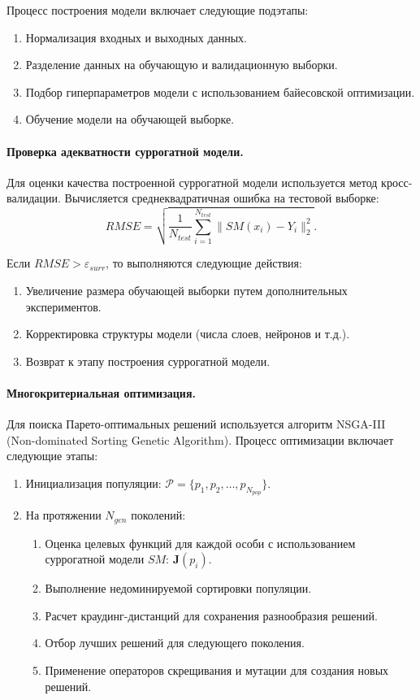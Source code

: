 Процесс построения модели включает следующие подэтапы:
\begin{enumerate}
    \item Нормализация входных и выходных данных.
    \item Разделение данных на обучающую и валидационную выборки.
    \item Подбор гиперпараметров модели с использованием байесовской оптимизации.
    \item Обучение модели на обучающей выборке.
\end{enumerate}

\paragraph*{Проверка адекватности суррогатной модели.}

Для оценки качества построенной суррогатной модели используется метод
кросс-валидации. Вычисляется среднеквадратичная ошибка на тестовой выборке:
\begin{equation}
    RMSE = \sqrt{\frac{1}{N_{test}} \sum_{i=1}^{N_{test}} \| SM(x_i) - Y_i \|_2^2}.
\end{equation}

Если $RMSE > \varepsilon_{surr}$, то выполняются следующие действия:
\begin{enumerate}
    \item Увеличение размера обучающей выборки путем дополнительных экспериментов.
    \item Корректировка структуры модели (числа слоев, нейронов и т.д.).
    \item Возврат к этапу построения суррогатной модели.
\end{enumerate}

\paragraph*{Многокритериальная оптимизация.}

Для поиска Парето-оптимальных решений используется алгоритм NSGA-III (Non-dominated Sorting Genetic Algorithm).
Процесс оптимизации включает следующие этапы:
\begin{enumerate}
    \item Инициализация популяции: $\mathcal{P} = \{p_1, p_2, \ldots, p_{N_{pop}}\}.$
    \item На протяжении $N_{gen}$ поколений:
          \begin{enumerate}
              \item Оценка целевых функций для каждой особи с использованием суррогатной модели $SM$: $\mathbf{J}(p_i).$
              \item Выполнение недоминируемой сортировки популяции.
              \item Расчет краудинг-дистанций для сохранения разнообразия решений.
              \item Отбор лучших решений для следующего поколения.
              \item Применение операторов скрещивания и мутации для создания новых решений.
          \end{enumerate}
\end{enumerate}

